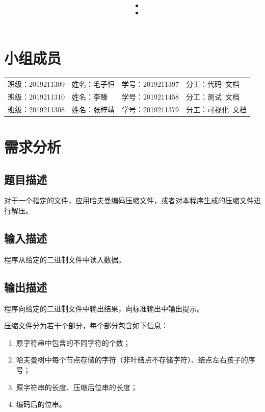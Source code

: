 \documentclass{article}
\title{\hmwkClass\ ：\hmwkTitle}
\author{\hmwkAuthorName}
\begin{document}
\maketitle

\section*{小组成员}

\setlength{\tabcolsep}{9mm}
{
    \begin{table}[htbp]
        \centering
        \begin{tabular}{llll}
            班级：2019211309 & 姓名：毛子恒 & 学号：2019211397 & 分工：代码\ 文档   \\

            班级：2019211310 & 姓名：李臻   & 学号：2019211458 & 分工：测试\ 文档   \\

            班级：2019211308 & 姓名：张梓靖 & 学号：2019211379 & 分工：可视化\ 文档 \\
        \end{tabular}
    \end{table}
}

\tableofcontents
\newpage

\section{需求分析}

\subsection{题目描述}

对于一个指定的文件，应用哈夫曼编码压缩文件，或者对本程序生成的压缩文件进行解压。

\subsection{输入描述}

程序从给定的二进制文件中读入数据。

\subsection{输出描述}

程序向给定的二进制文件中输出结果，向标准输出中输出提示。

压缩文件分为若干个部分，每个部分包含如下信息：

\begin{enumerate}
    \item 原字符串中包含的不同字符的个数；
    \item 哈夫曼树中每个节点存储的字符（非叶结点不存储字符）、结点左右孩子的序号；
    \item 原字符串的长度、压缩后位串的长度；
    \item 编码后的位串。
\end{enumerate}
\end{document}
